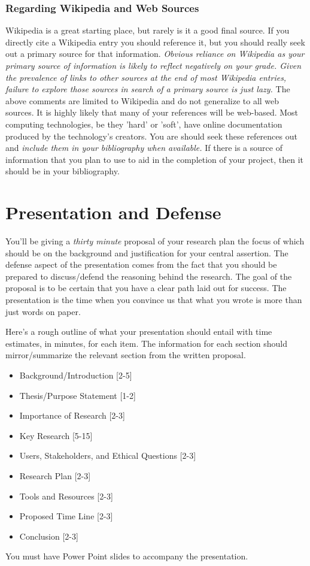 \documentclass[10pt]{article}
\begin{document}
\subsubsection{ Regarding Wikipedia and Web Sources}
Wikipedia is a great starting place, but rarely is it a good final source.  If you directly cite a Wikipedia entry you should reference it, but you should really seek out a primary source for that information.  \textit{Obvious reliance on Wikipedia as your primary source of information is likely to reflect negatively on your grade.  Given the prevalence of links to other sources at the end of most Wikipedia entries, failure to explore those sources in search of a primary source is just lazy.}  The above comments are limited to Wikipedia and do not generalize to all web sources.
It is highly likely that many of your references will be web-based.  Most computing technologies, be they 'hard' or 'soft', have online documentation produced by the technology's creators.  You are should seek these references out and \textit{include them in your bibliography when available.}  If there is a source of information that you plan to use to aid in the completion of your project, then it should be in your bibliography.

\section{Presentation and Defense}

You'll be giving a \textit{thirty minute} proposal of your research plan the focus of which should be on the background and justification for your central assertion. The defense aspect of the presentation comes from the fact that you should be prepared to discuss/defend the reasoning behind the research.  The goal of the proposal is to be certain that you have a clear path laid out for success.  The presentation is the time when you convince us that what you wrote is more than just words on paper.  

Here's a rough outline of what your presentation should entail with time estimates, in minutes, for each item.  The information for each section should mirror/summarize the relevant section from the written proposal. 
\begin{itemize}
\item Background/Introduction [2-5]
\item Thesis/Purpose Statement [1-2]
\item Importance of Research [2-3]
\item Key Research [5-15]
\item Users, Stakeholders, and Ethical Questions [2-3]
\item Research Plan [2-3]
\item Tools and Resources [2-3]
\item Proposed Time Line [2-3]
\item Conclusion [2-3]
\end{itemize}
You must have Power Point slides to accompany the presentation.
\end{document}
